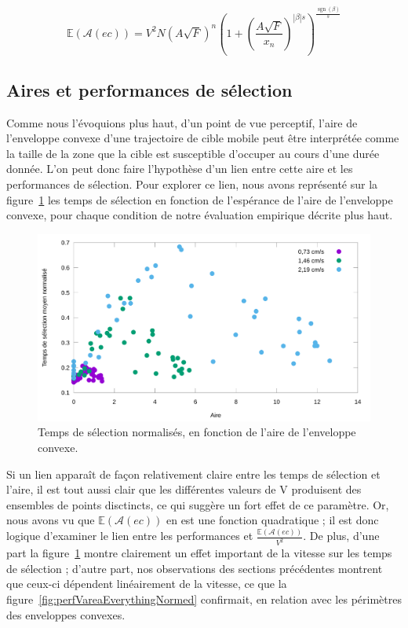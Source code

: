 	\begin{equation}
		\mathbb{E}(\mathcal{A}(ec)) = V^{2}N \left( A\sqrt{F} \right)^n \left(1+\left(\frac{A\sqrt{F}}{x_n}\right)^{|\beta|s}\right)^{\frac{\operatorname{sgn}(\beta)}{s}}
		\label{eq:areaModel}
	\end{equation}
	
	\subsection{Aires et performances de sélection}
	Comme nous l'évoquions plus haut, d'un point de vue perceptif, l'aire de l'enveloppe convexe d'une trajectoire de cible mobile peut être interprétée comme la taille de la zone que la cible est susceptible d'occuper au cours d'une durée donnée. L'on peut donc faire l'hypothèse d'un lien entre cette aire et les performances de sélection. Pour explorer ce lien, nous avons représenté sur la figure~\ref{fig:perf_V_RealArea_raw} les temps de sélection en fonction de l'espérance de l'aire de l'enveloppe convexe, pour chaque condition de notre évaluation empirique décrite plus haut.
	
	\begin{figure}[!htbp]
		\centering
		\includegraphics[width=\textwidth]{figures/ch4/perf_V_RealArea_raw}
		\caption[MTSN en fonction de l'aire]{Temps de sélection normalisés, en fonction de l'aire de l'enveloppe convexe.}
		\label{fig:perf_V_RealArea_raw}
	\end{figure}
	
	Si un lien apparaît de façon relativement claire entre les temps de sélection et l'aire, il est tout aussi clair que les différentes valeurs de V produisent des ensembles de points disctincts, ce qui suggère un fort effet de ce paramètre. Or, nous avons vu que $\mathbb{E}(\mathcal{A}(ec))$ en est une fonction quadratique ; il est donc logique d'examiner le lien entre les performances et $\frac{\mathbb{E}(\mathcal{A}(ec))}{V^{2}}$. De plus, d'une part la figure~\ref{fig:perf_V_RealArea_raw} montre clairement un effet important de la vitesse sur les temps de sélection ; d'autre part, nos observations des sections précédentes montrent que ceux-ci dépendent linéairement de la vitesse, ce que la figure~\ref{fig:perfVareaEverythingNormed} confirmait, en relation avec les périmètres des enveloppes convexes.
	

